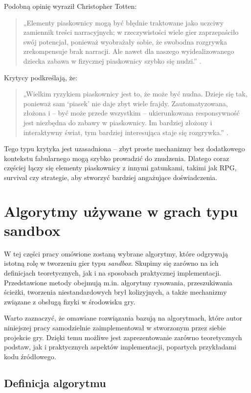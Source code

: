\documentclass[a4paper,12pt]{book} %
\begin{document}
Podobną opinię wyraził Christopher Totten:
\begin{quote}
„Elementy piaskownicy mogą być błędnie traktowane jako uczciwy zamiennik treści narracyjnych; w rzeczywistości wiele gier zaprzepaściło swój potencjał, ponieważ wyobrażały sobie, że swobodna rozgrywka zrekompensuje brak narracji. Ale nawet dla naszego wyidealizowanego dziecka zabawa w fizycznej piaskownicy szybko się nudzi.” \cite{Quote_2}.
\end{quote}

Krytycy podkreślają, że:
\begin{quote}
„Wielkim ryzykiem piaskownicy jest to, że może być nudna. Dzieje się tak, ponieważ sam ‘piasek’ nie daje zbyt wiele frajdy. Zautomatyzowana, złożona i – być może przede wszystkim – ukierunkowana responsywność jest niezbędna do zabawy w piaskownicy. Im bardziej złożony i interaktywny świat, tym bardziej interesująca staje się rozgrywka.” \cite{Quote_3}.
\end{quote}

Tego typu krytyka jest uzasadniona – zbyt proste mechanizmy bez dodatkowego kontekstu fabularnego mogą szybko prowadzić do znudzenia. Dlatego coraz częściej łączy się elementy piaskownicy z innymi gatunkami, takimi jak RPG, survival czy strategie, aby stworzyć bardziej angażujące doświadczenia.

\chapter{Algorytmy używane w grach typu sandbox}
W tej części pracy omówione zostaną wybrane algorytmy, które odgrywają istotną rolę w tworzeniu gier typu \textit{sandbox}. Skupimy się zarówno na ich definicjach teoretycznych, jak i na sposobach praktycznej implementacji. Przedstawione metody obejmują m.in. algorytmy rysowania, przeszukiwania ścieżki, tworzenia niestandardowych brył kolizyjnych, a także mechanizmy związane z obsługą fizyki w środowisku gry.

Warto zaznaczyć, że omawiane rozwiązania bazują na algorytmach, które autor niniejszej pracy samodzielnie zaimplementował w stworzonym przez siebie projekcie gry. Dzięki temu możliwe jest zaprezentowanie zarówno teoretycznych podstaw, jak i praktycznych aspektów implementacji, popartych przykładami kodu źródłowego.

\section{Definicja algorytmu}
\end{document}
